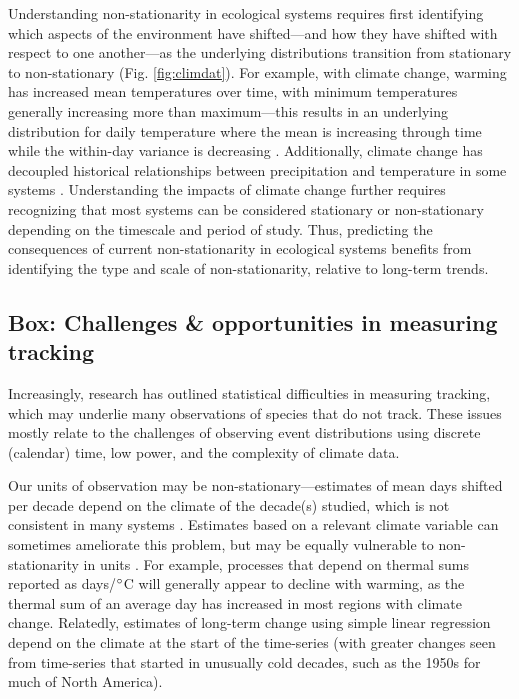 \documentclass[11pt,letterpaper]{article}
\newcommand{\R}[1]{\label{}\linelabel{#1}} %
\begin{document}
Understanding non-stationarity in ecological systems requires first identifying which aspects of the environment have shifted---and how they have shifted with respect to one another---as the underlying  distributions transition from stationary to non-stationary (Fig. \ref{fig:climdat}). For example, with climate change, warming has increased mean temperatures over time, with minimum temperatures generally increasing more than maximum---this results in an underlying distribution for daily temperature where the mean is increasing through time while the within-day variance is decreasing \citep{ipcc2013,screen2014}. \R{citewagS}Additionally, climate change has decoupled historical relationships between precipitation and temperature in some systems \citep[e.g.,][]{cookwine2016,wadgymar2018}.\R{citewagE} Understanding the impacts of climate change further requires recognizing that most systems can be considered stationary or non-stationary depending on the timescale and period of study. Thus, predicting the consequences of current non-stationarity in ecological systems benefits from identifying the type and scale of non-stationarity, relative to long-term trends.  



\subsection{Box: Challenges \& opportunities in measuring tracking} %
Increasingly, research has outlined statistical difficulties in measuring tracking, which may underlie many observations of species that do not track. These issues mostly relate to the challenges of observing event distributions \citep{steer2019,carter2018} using discrete (calendar) time, low power, and the complexity of climate data. 

Our units of observation may be non-stationary---estimates of mean days shifted per decade depend on the climate of the decade(s) studied, which is not consistent in many systems \citep{McCabe2012}. Estimates based on a relevant climate variable can sometimes ameliorate this problem, but may be equally vulnerable to non-stationarity in units \citep[e.g.,][]{Sagarin:2001fu}. For example, processes that depend on thermal sums reported as days/$\degree$C will generally appear to decline with warming, as the thermal sum of an average day has increased in most regions with climate change. Relatedly, estimates of long-term change using simple linear regression depend on the climate at the start of the time-series (with greater changes seen from time-series that started in unusually cold decades, such as the 1950s for much of North America). 
\end{document}
